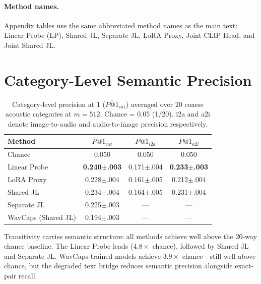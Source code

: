 \documentclass{article}
\begin{document}




\FloatBarrier
\appendix

\paragraph{Method names.}
Appendix tables use the same abbreviated method names as the main text: Linear Probe (LP), Shared JL, Separate JL, LoRA Proxy, Joint CLIP Head, and Joint Shared JL.

\section{Category-Level Semantic Precision}
\label{app:cat}

\begin{table}[ht]
  \caption{Category-level precision at 1 ($\overline{P\text{@}1}_{\mathrm{cat}}$) averaged over 20 coarse acoustic categories at $m=512$.
  Chance = 0.05 (1/20).
  i2a and a2i denote image-to-audio and audio-to-image precision respectively.}
  \label{tab:cat}
  \centering
  \footnotesize
  \begin{tabular}{lccc}
    \toprule
    Method & $\overline{P\text{@}1}_\mathrm{cat}$ & $P\text{@}1_{i2a}$ & $P\text{@}1_{a2i}$ \\
    \midrule
    Chance & 0.050 & 0.050 & 0.050 \\
    \midrule
    Linear Probe & \bf{0.240$\pm$.003} & 0.171$\pm$.004 & \bf{0.233$\pm$.003} \\
    LoRA Proxy & 0.228$\pm$.004 & 0.161$\pm$.005 & 0.212$\pm$.004 \\
    Shared JL & 0.234$\pm$.004 & 0.164$\pm$.005 & 0.231$\pm$.004 \\
    Separate JL & 0.225$\pm$.003 & --- & --- \\
    \midrule
    WavCaps (Shared JL) & 0.194$\pm$.003 & --- & --- \\
    \bottomrule
  \end{tabular}
\end{table}

Transitivity carries semantic structure: all methods achieve well above the 20-way chance baseline.
The Linear Probe leads ($4.8\times$ chance), followed by Shared JL and Separate JL.
WavCaps-trained models achieve $3.9\times$ chance---still well above chance, but the degraded text bridge reduces semantic precision alongside exact-pair recall.
\end{document}
